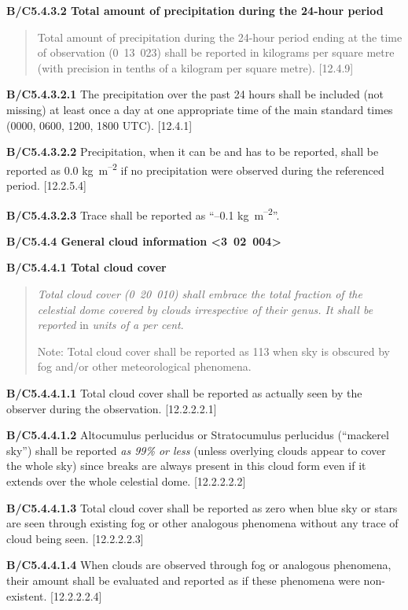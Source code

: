 \textbf{B/C5.4.3.2 Total amount of precipitation during the 24-hour period}

\begin{quote}
Total amount of precipitation during the 24-hour period ending at the time of observation (0~13~023) shall be reported in kilograms per square metre (with precision in tenths of a kilogram per square metre). {[}12.4.9{]}
\end{quote}

\textbf{B/C5.4.3.2.1} The precipitation over the past 24 hours shall be included (not missing) at least once a day at one appropriate time of the main standard times (0000, 0600, 1200, 1800 UTC). {[}12.4.1{]}

\textbf{B/C5.4.3.2.2} Precipitation, when it can be and has to be reported, shall be reported as 0.0 kg~m\textsuperscript{--2} if no precipitation were observed during the referenced period. {[}12.2.5.4{]}

\textbf{B/C5.4.3.2.3} Trace shall be reported as ``--0.1 kg~m\textsuperscript{--2}''.

\textbf{B/C5.4.4 General cloud information \textless3~02~004\textgreater{}}

\textbf{B/C5.4.4.1 Total cloud cover}

\begin{quote}
\emph{Total cloud cover (0~20~010) shall embrace the total fraction of the celestial dome covered by clouds irrespective of their genus. It shall be reported} in \emph{units of a per cent}.

Note: Total cloud cover shall be reported as 113 when sky is obscured by fog and/or other meteorological phenomena.
\end{quote}

\textbf{B/C5.4.4.1.1} Total cloud cover shall be reported as actually seen by the observer during the observation. {[}12.2.2.2.1{]}

\textbf{B/C5.4.4.1.2} Altocumulus perlucidus or Stratocumulus perlucidus (``mackerel sky'') shall be reported \emph{as 99\% or less} (unless overlying clouds appear to cover the whole sky) since breaks are always present in this cloud form even if it extends over the whole celestial dome. {[}12.2.2.2.2{]}

\textbf{B/C5.4.4.1.3} Total cloud cover shall be reported as zero when blue sky or stars are seen through existing fog or other analogous phenomena without any trace of cloud being seen. {[}12.2.2.2.3{]}

\textbf{B/C5.4.4.1.4} When clouds are observed through fog or analogous phenomena, their amount shall be evaluated and reported as if these phenomena were non-existent. {[}12.2.2.2.4{]}

